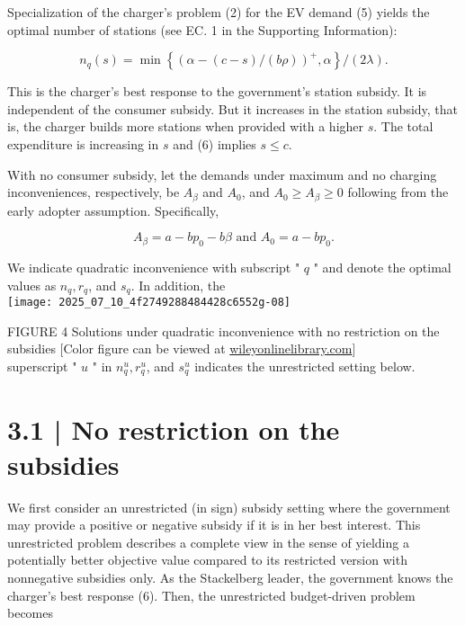 \documentclass[10pt]{article}
\begin{document}
Specialization of the charger's problem (2) for the EV demand (5) yields the optimal number of stations (see EC. 1 in the Supporting Information):


\begin{equation*}
n_{q}(s)=\min \left\{(\alpha-(c-s) /(b \rho))^{+}, \alpha\right\} /(2 \lambda) . \tag{6}
\end{equation*}


This is the charger's best response to the government's station subsidy. It is independent of the consumer subsidy. But it increases in the station subsidy, that is, the charger builds more stations when provided with a higher $s$. The total expenditure is increasing in $s$ and (6) implies $s \leq c$.

With no consumer subsidy, let the demands under maximum and no charging inconveniences, respectively, be $A_{\beta}$ and $A_{0}$, and $A_{0} \geq A_{\beta} \geq 0$ following from the early adopter assumption. Specifically,


\begin{equation*}
A_{\beta}=a-b p_{0}-b \beta \text { and } A_{0}=a-b p_{0} . \tag{7}
\end{equation*}


We indicate quadratic inconvenience with subscript " $q$ " and denote the optimal values as $n_{q}, r_{q}$, and $s_{q}$. In addition, the\\
\texttt{[image: 2025\_07\_10\_4f2749288484428c6552g-08]}

FIGURE 4 Solutions under quadratic inconvenience with no restriction on the subsidies [Color figure can be viewed at \href{http://wileyonlinelibrary.com}{wileyonlinelibrary.com}]\\
superscript " $u$ " in $n_{q}^{u}, r_{q}^{u}$, and $s_{q}^{u}$ indicates the unrestricted setting below.

\section*{3.1 | No restriction on the subsidies}
We first consider an unrestricted (in sign) subsidy setting where the government may provide a positive or negative subsidy if it is in her best interest. This unrestricted problem describes a complete view in the sense of yielding a potentially better objective value compared to its restricted version with nonnegative subsidies only. As the Stackelberg leader, the government knows the charger's best response (6). Then, the unrestricted budget-driven problem becomes
\end{document}
